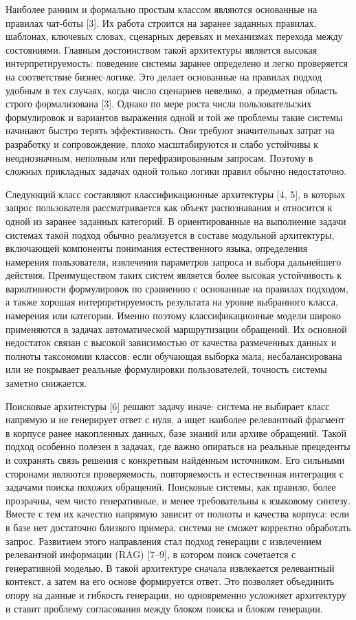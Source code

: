 \documentclass[14pt,a4paper]{extarticle}
\numberwithin{figure}{section}
\numberwithin{table}{section}
\begin{document}
Наиболее ранним и формально простым классом являются основанные на правилах чат-боты
[3]. Их работа строится на заранее заданных правилах, шаблонах,
ключевых словах, сценарных деревьях и механизмах перехода между
состояниями. Главным достоинством такой архитектуры является высокая
интерпретируемость: поведение системы заранее определено и легко
проверяется на соответствие бизнес-логике. Это делает основанные на правилах подход
удобным в тех случаях, когда число сценариев невелико, а предметная
область строго формализована [3]. Однако по мере роста числа
пользовательских формулировок и вариантов выражения одной и той же
проблемы такие системы начинают быстро терять эффективность. Они требуют
значительных затрат на разработку и сопровождение, плохо масштабируются
и слабо устойчивы к неоднозначным, неполным или перефразированным
запросам. Поэтому в сложных прикладных задачах одной только логики
правил обычно недостаточно.

Следующий класс составляют классификационные архитектуры [4, 5], в
которых запрос пользователя рассматривается как объект распознавания и
относится к одной из заранее заданных категорий. В ориентированные на выполнение задачи
системах такой подход обычно реализуется в составе модульной
архитектуры, включающей компоненты понимания естественного языка,
определения намерения пользователя, извлечения параметров запроса и
выбора дальнейшего действия. Преимуществом таких систем является более
высокая устойчивость к вариативности формулировок по сравнению с
основанные на правилах подходом, а также хорошая интерпретируемость результата на
уровне выбранного класса, намерения или категории. Именно поэтому
классификационные модели широко применяются в задачах автоматической
маршрутизации обращений. Их основной недостаток связан с высокой
зависимостью от качества размеченных данных и полноты таксономии
классов: если обучающая выборка мала, несбалансирована или не покрывает
реальные формулировки пользователей, точность системы заметно снижается.

Поисковые архитектуры [6] решают задачу иначе: система не
выбирает класс напрямую и не генерирует ответ с нуля, а ищет наиболее
релевантный фрагмент в корпусе ранее накопленных данных, базе знаний или
архиве обращений. Такой подход особенно полезен в задачах, где важно
опираться на реальные прецеденты и сохранять связь решения с конкретным
найденным источником. Его сильными сторонами являются проверяемость,
повторяемость и естественная интеграция с задачами поиска похожих
обращений. Поисковые системы, как правило, более прозрачны, чем
чисто генеративные, и менее требовательны к языковому синтезу. Вместе с
тем их качество напрямую зависит от полноты и качества корпуса: если в
базе нет достаточно близкого примера, система не сможет корректно
обработать запрос. Развитием этого направления стал подход
генерации с извлечением релевантной информации (RAG) [7--9], в котором поиск сочетается с
генеративной моделью. В такой архитектуре сначала извлекается
релевантный контекст, а затем на его основе формируется ответ. Это
позволяет объединить опору на данные и гибкость генерации, но
одновременно усложняет архитектуру и ставит проблему согласования между
блоком поиска и блоком генерации.
\end{document}
